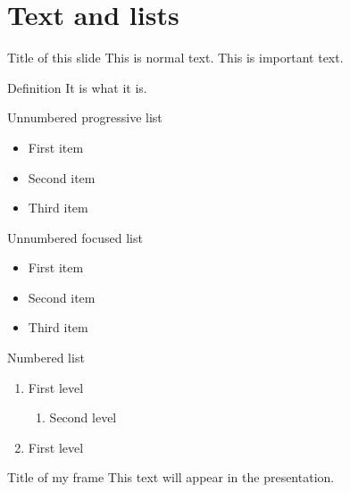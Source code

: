 
\section{Text and lists}

\begin{frame}{Title of this slide}
 This is normal text. This is \alert{important text}.
 \begin{block}{Definition}
  It is what it is.
 \end{block}
\end{frame}

\begin{frame}{Unnumbered progressive list}
 \begin{itemize}
  \item<1-> First item
  \item<2-> Second item
  \item<3-> Third item
 \end{itemize}
\end{frame}

\begin{frame}{Unnumbered focused list}
 \begin{itemize}
  \item<1> First item
  \item<2> Second item
  \item<3> Third item
 \end{itemize}
\end{frame}

\begin{frame}{Numbered list}
 \begin{enumerate}
  \item First level
  \begin{enumerate}
   \item Second level
  \end{enumerate}
  \item First level
 \end{enumerate}
\end{frame}

\begin{frame}{Title of my frame}
 This text will appear in the presentation. 
\end{frame}


